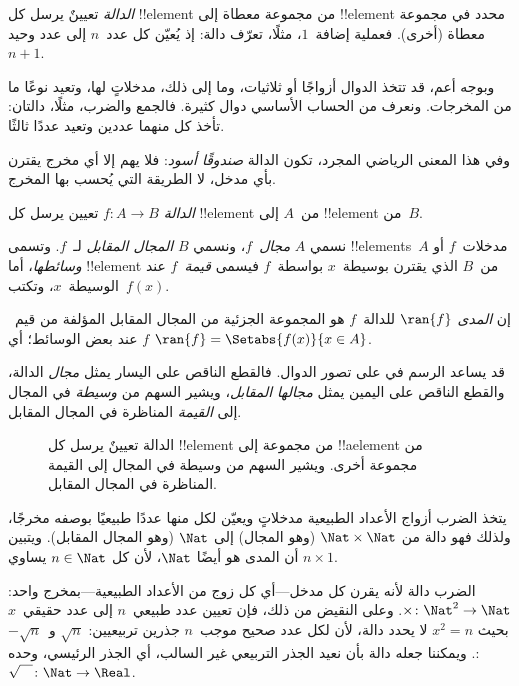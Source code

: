 \documentclass[../../../include/open-logic-section]{subfiles}
\begin{document}

\begin{explain}
\emph{الدالة} تعيينٌ يرسل كل !!{element} من مجموعة معطاة
إلى !!{element} محدد في مجموعة معطاة (أخرى). فعملية
إضافة~$1$، مثلًا، تعرّف دالة: إذ يُعيّن كل عدد~$n$
إلى عدد وحيد~$n+1$.

وبوجه أعم، قد تتخذ الدوال أزواجًا أو ثلاثيات، وما إلى ذلك، مدخلاتٍ لها،
وتعيد نوعًا ما من المخرجات. ونعرف من الحساب الأساسي دوال كثيرة.
فالجمع والضرب، مثلًا، دالتان: تأخذ كل منهما عددين وتعيد عددًا ثالثًا.

وفي هذا المعنى الرياضي المجرد، تكون الدالة \emph{صندوقًا
أسود}: فلا يهم إلا أي مخرج يقترن بأي مدخل، لا الطريقة
التي يُحسب بها المخرج.
\end{explain}

\begin{defn}[الدالة]
\emph{الدالة} $f \colon A \to B$ تعيين يرسل كل !!{element}
من~$A$ إلى !!{element} من~$B$.

نسمي $A$ \emph{مجال}~$f$، ونسمي $B$ \emph{المجال المقابل}
لـ~$f$. وتسمى !!{element}s~$A$ مدخلات~$f$ أو \emph{وسائطها}،
أما !!{element} من~$B$ الذي يقترن بوسيطة~$x$ بواسطة~$f$ فيسمى
\emph{قيمة~$f$} عند الوسيطة~$x$،
وتكتب~$f(x)$.

إن \emph{المدى} $\ran{f}$ للدالة~$f$ هو المجموعة الجزئية من المجال المقابل
المؤلفة من قيم~$f$ عند بعض الوسائط؛ أي $\ran{f} =
\Setabs{f(x)}{x \in A}$.
\end{defn}

قد يساعد الرسم في  على تصور الدوال. فالقطع الناقص
على اليسار يمثل \emph{مجال} الدالة، والقطع الناقص على
اليمين يمثل \emph{مجالها المقابل}، ويشير السهم
من \emph{وسيطة} في المجال إلى
\emph{القيمة} المناظرة في المجال المقابل.

\begin{figure}
  \caption{الدالة تعيينٌ يرسل كل !!{element} من مجموعة إلى
    !!a{element} من مجموعة أخرى. ويشير السهم من وسيطة في
    المجال إلى القيمة المناظرة في المجال المقابل.}
\end{figure}

\begin{ex}
يتخذ الضرب أزواج الأعداد الطبيعية مدخلاتٍ ويعيّن لكل منها
عددًا طبيعيًا بوصفه مخرجًا، ولذلك فهو دالة من $\Nat \times \Nat$ (وهو
المجال) إلى $\Nat$ (وهو المجال المقابل). ويتبين أن المدى هو أيضًا
$\Nat$، لأن كل $n \in \Nat$ يساوي $n \times 1$.
\end{ex}

\begin{ex}
الضرب دالة لأنه يقرن كل مدخل---أي كل زوج
من الأعداد الطبيعية---بمخرج واحد: $\times \colon \Nat^2 \to
\Nat$. وعلى النقيض من ذلك، فإن تعيين عدد طبيعي~$n$ إلى عدد حقيقي~$x$ بحيث
$x^2 = n$ لا يحدد دالة، لأن لكل عدد صحيح موجب~$n$ جذرين
تربيعيين: $\sqrt{n}$ و~$-\sqrt{n}$. ويمكننا جعله دالة بأن
نعيد الجذر التربيعي غير السالب، أي الجذر الرئيسي، وحده: $\sqrt{\phantom{X}} \colon
\Nat \to \Real$.
\end{ex}
\end{document}
